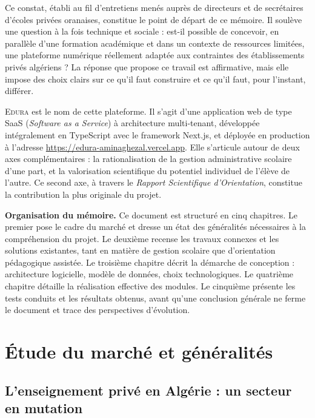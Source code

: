 \documentclass[12pt,a4paper,oneside]{report}
\newcommand{\edura}{\textsc{Edura}}
\begin{document}
Ce constat, établi au fil d'entretiens menés auprès de directeurs et de secrétaires d'écoles privées oranaises, constitue le point de départ de ce mémoire. Il soulève une question à la fois technique et sociale : est-il possible de concevoir, en parallèle d'une formation académique et dans un contexte de ressources limitées, une plateforme numérique réellement adaptée aux contraintes des établissements privés algériens ? La réponse que propose ce travail est affirmative, mais elle impose des choix clairs sur ce qu'il faut construire et ce qu'il faut, pour l'instant, différer.

\edura{} est le nom de cette plateforme. Il s'agit d'une application web de type SaaS (\textit{Software as a Service}) à architecture multi-tenant, développée intégralement en TypeScript avec le framework Next.js, et déployée en production à l'adresse \url{https://edura-aminaghezal.vercel.app}. Elle s'articule autour de deux axes complémentaires : la rationalisation de la gestion administrative scolaire d'une part, et la valorisation scientifique du potentiel individuel de l'élève de l'autre. Ce second axe, à travers le \textit{Rapport Scientifique d'Orientation}, constitue la contribution la plus originale du projet.

\vspace{6pt}
\noindent\textbf{Organisation du mémoire.} Ce document est structuré en cinq chapitres. Le premier pose le cadre du marché et dresse un état des généralités nécessaires à la compréhension du projet. Le deuxième recense les travaux connexes et les solutions existantes, tant en matière de gestion scolaire que d'orientation pédagogique assistée. Le troisième chapitre décrit la démarche de conception : architecture logicielle, modèle de données, choix technologiques. Le quatrième chapitre détaille la réalisation effective des modules. Le cinquième présente les tests conduits et les résultats obtenus, avant qu'une conclusion générale ne ferme le document et trace des perspectives d'évolution.

\chapter{Étude du marché et généralités}

\section{L'enseignement privé en Algérie : un secteur en mutation}
\end{document}
